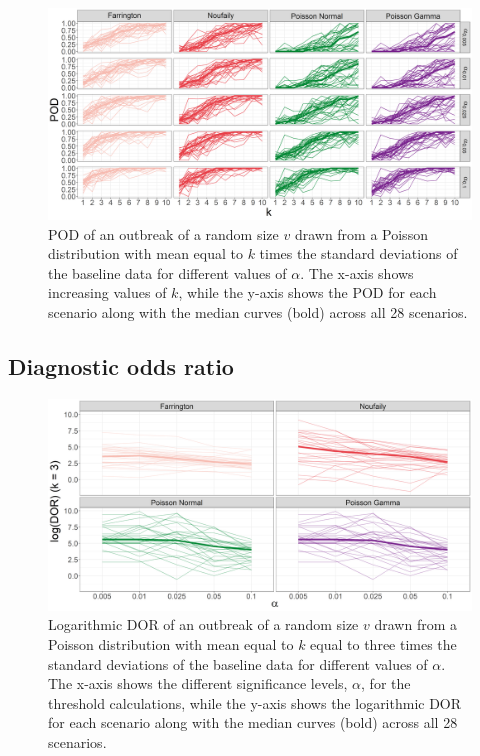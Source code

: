 \documentclass[preprint, 3p, authoryear]{elsarticle} %
\begin{document}
\begin{figure}[H]
\includegraphics[width=1\linewidth]{../../figures/POD_alpha_methods} \caption{POD of an outbreak of a random size \(v\) drawn from a Poisson distribution with mean equal to \(k\) times the standard deviations of the baseline data for different values of \(\alpha\). The x-axis shows increasing values of \(k\), while the y-axis shows the POD for each scenario along with the median curves (bold) across all 28 scenarios.}\label{fig:PODalphamethods}
\end{figure}

\hypertarget{diagnostic-odds-ratio-1}{%
\subsection{Diagnostic odds ratio}\label{diagnostic-odds-ratio-1}}



\begin{figure}[H]
\includegraphics[width=1\linewidth]{../../figures/logDORk3} \caption{Logarithmic DOR of an outbreak of a random size \(v\) drawn from a Poisson distribution with mean equal to \(k\) equal to three times the standard deviations of the baseline data for different values of \(\alpha\). The x-axis shows the different significance levels, \(\alpha\), for the threshold calculations, while the y-axis shows the logarithmic DOR for each scenario along with the median curves (bold) across all 28 scenarios.}\label{fig:logDORk3}
\end{figure}
\end{document}
